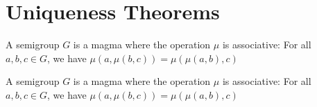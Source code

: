 \section{Uniqueness Theorems}
\usepackage{amsmath, amssymb}

\begin{theorem}
    \label{theorem : identity_uniqueness}
    \leanok
    A semigroup $G$ is a magma where the operation $\mu$ is associative:
    For all $a, b, c \in G$, we have $\mu(a , \mu (b , c)) = \mu(\mu(a, b), c)$
  \end{theorem}

\begin{theorem}
    \label{theorem : inverse_uniqueness}
    \leanok
    A semigroup $G$ is a magma where the operation $\mu$ is associative:
    For all $a, b, c \in G$, we have $\mu(a , \mu (b , c)) = \mu(\mu(a, b), c)$
  \end{theorem}

